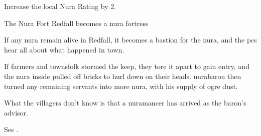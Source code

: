 Increase the local Nura Rating by 2.

{The Nura Fort}%
{Redfall becomes a nura fortress}%

If any nura remain alive in Redfall, it becomes a bastion for the nura, and the \glspl{pc} hear all about what happened in \gls{town}.

If farmers and townsfolk stormed the keep, they tore it apart to gain entry, and the nura inside pulled off bricks to hurl down on their heads.
\Gls{nurabaron} then turned any remaining servants into more nura, with his supply of ogre dust.

What the villagers don't know is that a nuramancer has arrived as the baron's advisor.

See .

\stopcontents[sq]
